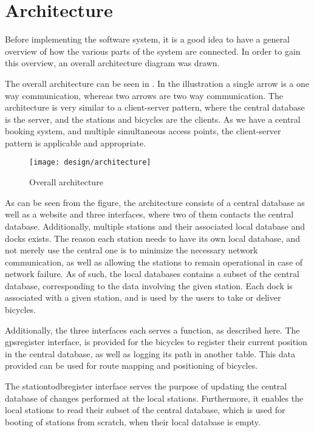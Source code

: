 \section{Architecture}
Before implementing the software system, it is a good idea to have a general overview of how the various parts of the system are connected.
In order to gain this overview, an overall architecture diagram was drawn.

The overall architecture can be seen in .
In the illustration a single arrow is a one way communication, whereas two arrows are two way communication.
The architecture is very similar to a client-server pattern, where the central database is the server, and the stations and bicycles are the clients.
As we have a central booking system, and multiple simultaneous access points, the client-server pattern is applicable and appropriate.

\begin{figure}[h]
	\centering
	\texttt{[image: design/architecture]}
	\caption{Overall architecture}\label{fig:overallarch}
\end{figure}

As can be seen from the figure, the architecture consists of a central database as well as a website and three interfaces, where two of them contacts the central database.
Additionally, multiple stations and their associated local database and docks exists.
The reason each station needs to have its own local database, and not merely use the central one is to minimize the necessary network communication, as well as allowing the stations to remain operational in case of network failure.
As of such, the local databases contains a subset of the central database, corresponding to the data involving the given station.
Each dock is associated with a given station, and is used by the users to take or deliver bicycles.

Additionally, the three interfaces each serves a function, as described here.
The gpsregister interface, is provided for the bicycles to register their current position in the central database, as well as logging its path in another table.
This data provided can be used for route mapping and positioning of bicycles.

The stationtodbregister interface serves the purpose of updating the central database of changes performed at the local stations. Furthermore, it enables the local stations to read their subset of the central database, which is used for booting of stations from scratch, when their local database is empty.

